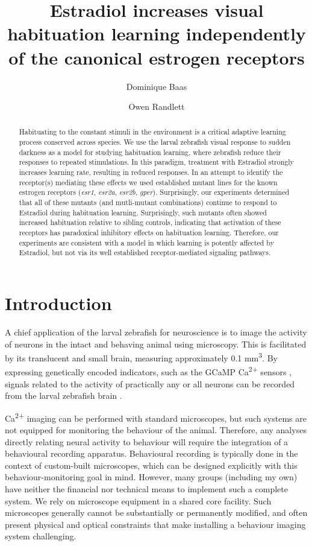 \documentclass[9pt,lineno]{RandlettLab_elife}
\title{Estradiol increases visual habituation learning independently of the canonical estrogen receptors}
\author[1]{Dominique Baas}
\author[1,*]{Owen Randlett}
\affil[1]{
Laboratoire MeLiS, UCBL - CNRS UMR5284 - Inserm U1314, Institut NeuroMyoGène, Faculté de Médecine et de Pharmacie, 8 avenue Rockefeller, 69008, Lyon, France 
}
\affil[*]{correspondence: \href{mailto:owen.randlett@univ-lyon1.fr}{owen.randlett@univ-lyon1.fr}}
\begin{document}
\maketitle
\begin{abstract}

Habituating to the constant stimuli in the environment is a critical adaptive learning process conserved across species. We use the larval zebrafish visual response to sudden darkness as a model for studying habituation learning, where zebrafish reduce their responses to repeated stimulations. In this paradigm, treatment with Estradiol strongly increases learning rate, resulting in reduced responses. In an attempt to identify the receptor(s) mediating these effects we used established mutant lines for the known estrogen receptors (\emph{esr1}, \emph{esr2a}, \emph{esr2b}, \emph{gper}). Surprisingly, our experiments determined that all of these mutants (and mutli-mutant combinations) continue to respond to Estradiol during habituation learning. Surprisingly, such mutants often showed increased habituation relative to sibling controls, indicating that activation of these receptors has paradoxical inhibitory effects on habituation learning. Therefore, our experiments are consistent with a model in which learning is potently affected by Estradiol, but not via its well established receptor-mediated signaling pathways.  

\end{abstract}

\section{Introduction}

A chief application of the larval zebrafish for neuroscience is to image the activity of neurons in the intact and behaving animal using microscopy. This is facilitated by its translucent and small brain, measuring approximately 0.1 mm\textsuperscript{3}. By expressing genetically encoded indicators, such as the GCaMP Ca\textsuperscript{2+} sensors \citep{Akerboom2012, Chen2013}, signals related to the activity of practically any or all neurons can be recorded from the larval zebrafish brain \citep{Ahrens2012, Portugues2014}. 

Ca\textsuperscript{2+} imaging can be performed with standard microscopes, but such systems are not equipped for monitoring the behaviour of the animal. Therefore, any analyses directly relating neural activity to behaviour will require the integration of a behavioural recording apparatus. Behavioural recording is typically done in the context of custom-built microscopes, which can be designed explicitly with this behaviour-monitoring goal in mind. However, many groups (including my own) have neither the financial nor technical means to implement such a complete system. We rely on microscope equipment in a shared core facility. Such microscopes generally cannot be substantially or permanently modified, and often present physical and optical constraints that make installing a behaviour imaging system challenging. 
\end{document}
